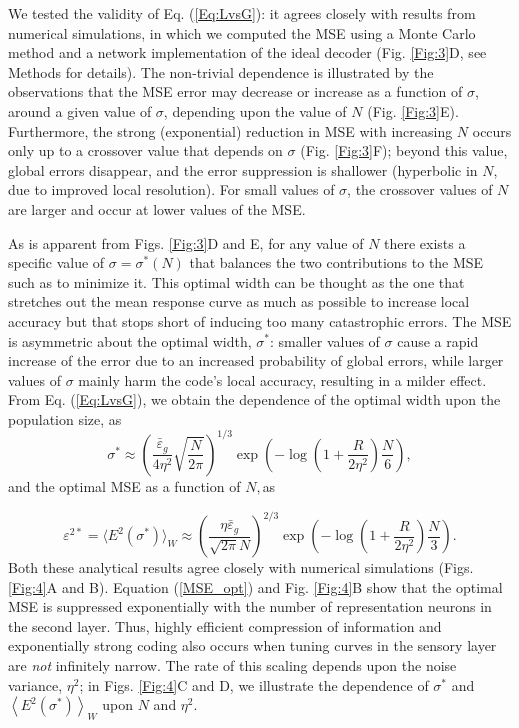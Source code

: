 \documentclass[a4paper]{article}%
\begin{document}
We tested the validity of Eq. (\ref{Eq:LvsG}): it agrees closely with results
from numerical simulations, in which we computed the MSE using a Monte Carlo
method and a network implementation of the ideal decoder (Fig. \ref{Fig:3}D,
see Methods for details). The non-trivial dependence is illustrated by the
observations that the MSE error may decrease or increase as a function of
$\sigma$, around a given value of $\sigma$, depending upon the value of $N$
(Fig. \ref{Fig:3}E). Furthermore, the strong (exponential) reduction in MSE
with increasing $N$ occurs only up to a crossover value that depends on
$\sigma$ (Fig. \ref{Fig:3}F); beyond this value, global errors disappear, and
the error suppression is shallower (hyperbolic in $N$, due to improved local
resolution). For small values of $\sigma$, the crossover values of $N$ are
larger and occur at lower values of the MSE.

As is apparent from Figs. \ref{Fig:3}D and E, for any value of $N$ there
exists a specific value of $\sigma=\sigma^{\ast}\left(  N\right)  $ that
balances the two contributions to the MSE such as to minimize it. This optimal
width can be thought as the one that stretches out the mean response curve as
much as possible to increase local accuracy but that stops short of inducing
too many catastrophic errors. The MSE is asymmetric about the optimal width,
$\sigma^{\ast}$: smaller values of $\sigma$ cause a rapid increase of the
error due to an increased probability of global errors, while larger values of
$\sigma$ mainly harm the code's local accuracy, resulting in a milder effect.
From Eq. (\ref{Eq:LvsG}), we obtain the dependence of the optimal width upon
the population size, as
\begin{equation}
\sigma^{\ast}\approx\left(  \frac{\bar{\varepsilon}_{g}}{4\eta^{2}}\sqrt
{\frac{N}{2\pi}}\right)  ^{1/3}\exp\left(  {-\log\left(  {1+\frac{R}{2\eta
^{2}}}\right)  \frac{N}{6}}\right)  , \label{Sigma_opt}%
\end{equation}
and the optimal MSE as a function of $N,$as%

\begin{equation}
\varepsilon^{2\ast}=\langle E^{2}(\sigma^{\ast})\rangle_{W}\approx\left(
\frac{\eta\bar{\varepsilon}_{g}}{\sqrt{2\pi}N}\right)  ^{2/3}\exp{\left(
-\log\left(  1+\frac{R}{2\eta^{2}}\right)  \frac{N}{3}\right)  }.
\label{MSE_opt}%
\end{equation}
Both these analytical results agree closely with numerical simulations (Figs.
\ref{Fig:4}A and B). Equation (\ref{MSE_opt}) and Fig. \ref{Fig:4}B show that
the optimal MSE is suppressed exponentially with the number of representation
neurons in the second layer. Thus, highly efficient compression of information
and exponentially strong coding also occurs when tuning curves in the sensory
layer are \textit{not} infinitely narrow. The rate of this scaling depends
upon the noise variance, $\eta^{2}$; in Figs. \ref{Fig:4}C and D, we
illustrate the dependence of $\sigma^{\ast}$ and $\left\langle E^{2}%
(\sigma^{\ast})\right\rangle _{W}$ upon $N$ and $\eta^{2}$.
\end{document}
